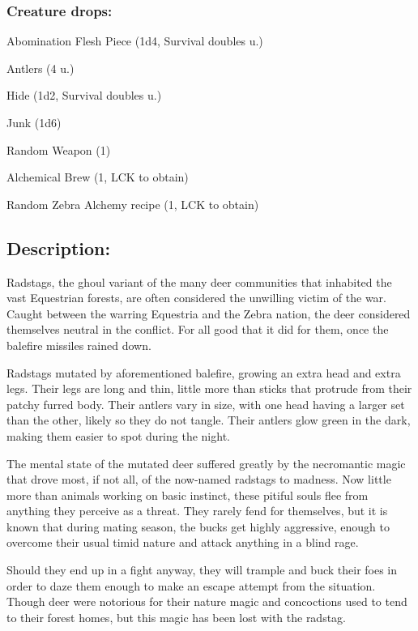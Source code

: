 \documentclass[11pt,a4paper,twocolumn]{book}
\begin{document}
	\subsubsection*{Creature drops:}
	\begin{compactitem}
		\item Abomination Flesh Piece (1d4, Survival doubles u.)
		\item Antlers (4 u.)
		\item Hide (1d2, Survival doubles u.)
		\item Junk (1d6)
		\item Random Weapon (1)
		\item Alchemical Brew (1, LCK to obtain)
		\item Random Zebra Alchemy recipe (1, LCK to obtain)
	\end{compactitem}
	
	\subsection*{Description:}
	Radstags, the ghoul variant of the many deer communities that inhabited the vast Equestrian forests, are often considered the unwilling victim of the war. Caught between the warring Equestria and the Zebra nation, the deer considered themselves neutral in the conflict. For all good that it did for them, once the balefire missiles rained down.
	
	Radstags mutated by aforementioned balefire, growing an extra head and extra legs. Their legs are long and thin, little more than sticks that protrude from their patchy furred body. Their antlers vary in size, with one head having a larger set than the other, likely so they do not tangle. Their antlers glow green in the dark, making them easier to spot during the night.
	
	The mental state of the mutated deer suffered greatly by the necromantic magic that drove most, if not all, of the now-named radstags to madness. Now little more than animals working on basic instinct, these pitiful souls flee from anything they perceive as a threat. They rarely fend for themselves, but it is known that during mating season, the bucks get highly aggressive, enough to overcome their usual timid nature and attack anything in a blind rage.
	
	Should they end up in a fight anyway, they will trample and buck their foes in order to daze them enough to make an escape attempt from the situation. Though deer were notorious for their nature magic and concoctions used to tend to their forest homes, but this magic has been lost with the radstag. 
	
\end{document}
